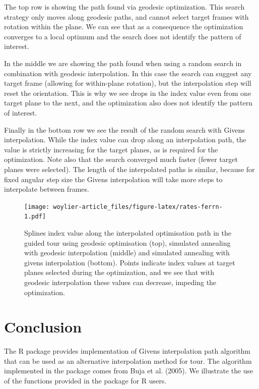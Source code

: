 The top row is showing the path found via geodesic optimization. This search strategy only moves along geodesic paths, and cannot select target frames with rotation within the plane. We can see that as a consequence the optimization converges to a local optimum and the search does not identify the pattern of interest.

In the middle we are showing the path found when using a random search in combination with geodesic interpolation. In this case the search can suggest any target frame (allowing for within-plane rotation), but the interpolation step will reset the orientation. This is why we see drops in the index value even from one target plane to the next, and the optimization also does not identify the pattern of interest.

Finally in the bottom row we see the result of the random search with Givens interpolation. While the index value can drop along an interpolation path, the value is strictly increasing for the target planes, as is required for the optimization. Note also that the search converged much faster (fewer target planes were selected). The length of the interpolated paths is similar, because for fixed angular step size the Givens interpolation will take more steps to interpolate between frames.

\begin{figure}
\centering
\texttt{[image: woylier-article\_files/figure-latex/rates-ferrn-1.pdf]}
\caption{\label{fig:rates-ferrn}Splines index value along the interpolated optimisation path in the guided tour using geodesic optimisation (top), simulated annealing with geodesic interpolation (middle) and simulated annealing with givens interpolation (bottom). Points indicate index values at target planes selected during the optimization, and we see that with geodesic interpolation these values can decrease, impeding the optimization.}
\end{figure}

\hypertarget{conclusion}{%
\section{Conclusion}\label{conclusion}}

The R package  provides implementation of Givens interpolation path algorithm that can be used as an alternative interpolation method for tour. The algorithm implemented in the  package comes from Buja et al. (2005). We illustrate the use of the functions provided in the package for R users.


